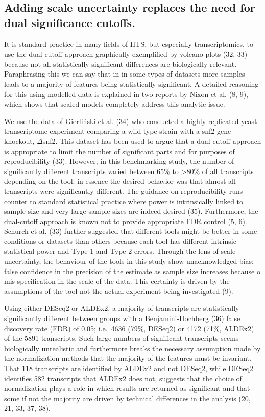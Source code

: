\documentclass[
]{article}
\begin{document}
\subsection{Adding scale uncertainty replaces the need for dual
significance
cutoffs.}\label{adding-scale-uncertainty-replaces-the-need-for-dual-significance-cutoffs.}

It is standard practice in many fields of HTS, but especially
transcriptomics, to use the dual cutoff approach graphically exemplified
by volcano plots (32, 33) because not all statistically significant
differences are biologically relevant. Paraphrasing this we can say that
in in some types of datasets more samples leads to a majority of
features being statistically significant. A detailed reasoning for this
using modelled data is explained in two reports by Nixon et al. (8, 9),
which shows that scaled models completely address this analytic issue.

We use the data of Gierliński et al. (34) who conducted a highly
replicated yeast transcriptome experiment comparing a wild-type strain
with a snf2 gene knockout, \(\Delta\)snf2. This dataset has been used to
argue that a dual cutoff approach is appropriate to limit the number of
significant parts and for purposes of reproducibility (33). However, in
this benchmarking study, the number of significantly different
transcripts varied between 65\% to \textgreater80\% of all transcripts
depending on the tool; in essence the desired behavior was that almost
all transcripts were significantly different. The guidance on
reproducibility runs counter to standard statistical practice where
power is intrinsically linked to sample size and very large sample sizes
are indeed desired (35). Furthermore, the dual-cutoff approach is known
not to provide appropriate FDR control (5, 6). Schurch et al. (33)
further suggested that different tools might be better in some
conditions or datasets than others because each tool has different
intrinsic statistical power and Type 1 and Type 2 errors. Through the
lens of scale uncertainty, the behaviour of the tools in this study show
unacknowledged bias; false confidence in the precision of the estimate
as sample size increases because o mis-specification in the scale of the
data. This certainty is driven by the assumptions of the tool not the
actual experiment being investigated (9).

Using either DESeq2 or ALDEx2, a majority of transcripts are
statistically significantly different between groups with a
Benjamini-Hochberg (36) false discovery rate (FDR) of 0.05; i.e.~4636
(79\%, DESeq2) or 4172 (71\%, ALDEx2) of the 5891 transcripts. Such
large numbers of significant transcripts seems biologically unrealistic
and furthermore breaks the necessary assumption made by the
normalization methods that the majority of the features must be
invariant. That 118 transcripts are identified by ALDEx2 and not DESeq2,
while DESeq2 identifies 582 transcripts that ALDEx2 does not, suggests
that the choice of normalization plays a role in which results are
returned as significant and that some if not the majority are driven by
technical differences in the analysis (20, 21, 33, 37, 38).
\end{document}
